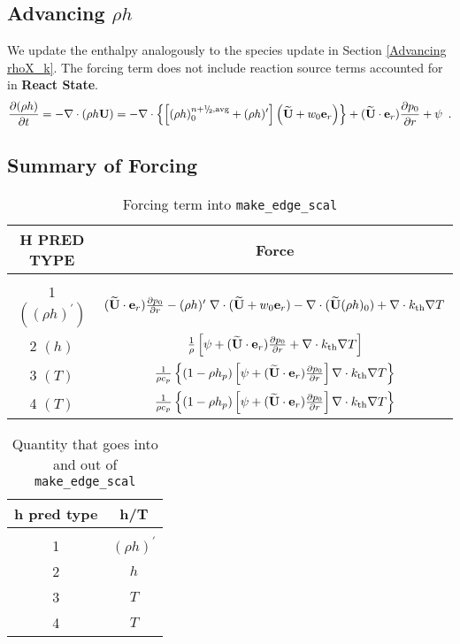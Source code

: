 \subsection{Advancing $\rho h$}
We update the enthalpy analogously to the species update in 
Section \ref{Advancing rhoX_k}.  The forcing term does not include reaction
source terms accounted for in {\bf React State}.
\begin{equation}
\frac{\partial(\rho h)}{\partial t} = -\nabla\cdot(\rho h\Ub) = 
-\nabla\cdot\left\{\left[(\rho h)_0^{n+\myhalf,{\rm avg}} 
+ (\rho h)'\right]\left(\Ubt + w_0\eb_r\right)\right\} + (\Ubt \cdot \er)\frac{\partial p_0}{\partial r} + \psi  \enskip .
\end{equation}

\subsection{Summary of Forcing}

\begin{table*}[h]
\begin{center}
\caption{Forcing term into {\tt make\_edge\_scal} \newline}
\begin{tabular}{c|c}
\hline
\hline
{H PRED TYPE} &   {Force} \\
\hline \\[-3mm]
1  $((\rho h)^\prime)$ &  $(\widetilde{{\bf U}} \cdot \mathbf{e}_r) \frac{\partial p_0}{\partial r} - 
 (\rho h)^\prime \; \nabla \cdot (\widetilde{{\bf U}}+w_0 \mathbf{e}_r) - 
 \nabla \cdot (\widetilde{{\bf U}} (\rho h)_0) + \nabla \cdot k_{\rm th} \nabla T$ \\[2 mm]
2  $(h)$ & $\frac{1}{\rho} \left [\psi + (\widetilde{{\bf U}} \cdot \mathbf{e}_r)
  \frac{\partial p_0}{\partial r} + \nabla \cdot k_{\rm th} \nabla T \right ]$ \\[2 mm]
3  $(T)$ & $\frac{1}{\rho c_p} \left \{ (1 - \rho h_p) 
   \left [\psi + (\widetilde{{\bf U}} \cdot \mathbf{e}_r) \frac{\partial p_0}{\partial r} \right ] \nabla \cdot k_{\rm th} \nabla T \right \}$ \\[2 mm]
4  $(T)$ & $\frac{1}{\rho c_p} \left\{ (1 - \rho h_p) \left [\psi + (\widetilde{{\bf U}} \cdot \mathbf{e}_r)
\frac{\partial p_0}{\partial r}\right ] \nabla \cdot k_{\rm th} \nabla T \right\}$ \\[2 mm]
\hline
\end{tabular}
\end{center}
\end{table*}

\begin{table*}[h]
\begin{center}
\caption{Quantity that goes into and out of {\tt make\_edge\_scal} \newline}
\begin{tabular}{c|c}
\hline
\hline
{h pred type} & {h/T } \\
\hline \\[-3mm]
1 & $(\rho h)^\prime$ \\
2 & $h$  \\
3 & $T$  \\
4 & $T$  \\
\hline
\end{tabular}
\end{center}
\end{table*}

